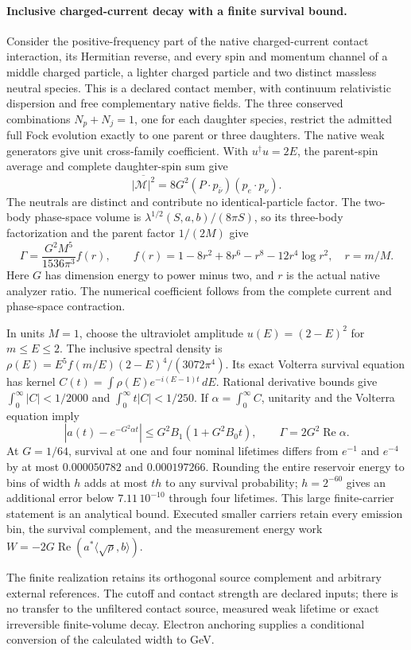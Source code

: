 \paragraph{Inclusive charged-current decay with a finite survival bound.}
Consider the positive-frequency part of the native charged-current contact
interaction, its Hermitian reverse, and every spin and momentum channel of
a middle charged particle, a lighter charged particle and two distinct
massless neutral species. This is a declared contact member, with continuum
relativistic dispersion and free complementary native fields. The three
conserved combinations $N_p+N_j=1$, one for each daughter species, restrict
the admitted full Fock evolution exactly to one parent or three daughters.
The native weak generators give unit cross-family coefficient. With
$u^\dagger u=2E$, the parent-spin average and complete daughter-spin sum give
\[
 \overline{|\mathcal M|^2}
 =8G^2(P\cdot p_{\bar\nu})(p_e\cdot p_\nu).
\]
The neutrals are distinct and contribute no identical-particle factor.
The two-body phase-space volume is
$\lambda^{1/2}(S,a,b)/(8\pi S)$, so its three-body factorization and the
parent factor $1/(2M)$ give
\[
 \Gamma=\frac{G^2M^5}{1536\pi^3}f(r),\qquad
 f(r)=1-8r^2+8r^6-r^8-12r^4\log r^2,
 \quad r=m/M.
\]
Here $G$ has dimension energy to power minus two, and $r$ is the actual
native analyzer ratio. The numerical coefficient follows from the complete
current and phase-space contraction.

In units $M=1$, choose the ultraviolet amplitude $u(E)=(2-E)^2$ for
$m\leq E\leq2$. The inclusive spectral density is
$\rho(E)=E^5 f(m/E)(2-E)^4/(3072\pi^4)$. Its exact Volterra survival equation
has kernel $C(t)=\int\rho(E)e^{-i(E-1)t}\,dE$. Rational derivative bounds give
$\int_0^\infty|C|<1/2000$ and
$\int_0^\infty t|C|<1/250$. If
$\alpha=\int_0^\infty C$, unitarity and the Volterra equation imply
\[
 |a(t)-e^{-G^2\alpha t}|
 \leq G^2B_1(1+G^2B_0t),\qquad
 \Gamma=2G^2\operatorname{Re}\alpha.
\]
At $G=1/64$, survival at one and four nominal lifetimes differs from
$e^{-1}$ and $e^{-4}$ by at most $0.000050782$ and $0.000197266$.
Rounding the entire reservoir energy to bins of width $h$ adds at most
$th$ to any survival probability; $h=2^{-60}$ gives an additional error
below $7.11\,10^{-10}$ through four lifetimes. This large finite-carrier
statement is an analytical bound. Executed smaller carriers retain every
emission bin, the survival complement, and the measurement energy work
$W=-2G\operatorname{Re}(a^*\langle\sqrt\rho,b\rangle)$.

The finite realization retains its orthogonal source complement and arbitrary
external references. The cutoff and contact strength are declared inputs;
there is no transfer to the unfiltered contact source, measured weak lifetime
or exact irreversible finite-volume decay. Electron anchoring supplies a
conditional conversion of the calculated width to GeV.
